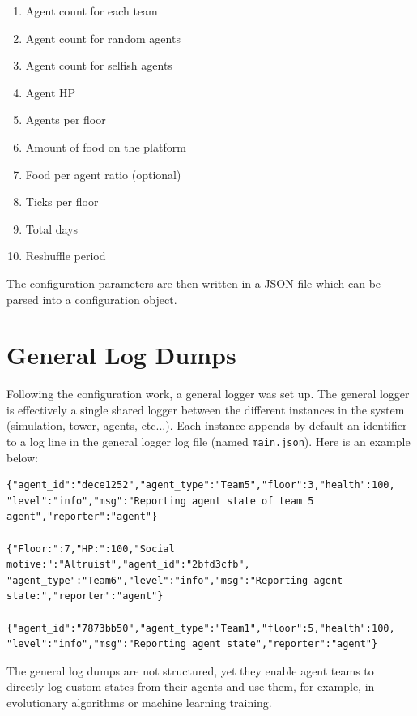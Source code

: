 \begin{multicols}{2}
    \begin{enumerate}
        \item Agent count for each team
        \item Agent count for random agents
        \item Agent count for selfish agents
        \item Agent HP
        \item Agents per floor
        \item Amount of food on the platform
        \item Food per agent ratio (optional)
        \item Ticks per floor
        \item Total days
        \item Reshuffle period
    \end{enumerate}

The configuration parameters are then written in a JSON file which can be parsed into a configuration object.

\section{General Log Dumps}

Following the configuration work, a general logger was set up. The general logger is effectively a single shared logger between the different instances in the system (simulation, tower, agents, etc...). Each instance appends by default an identifier to a log line in the general logger log file (named \texttt{main.json}). Here is an example below:

\begin{verbatim}
{"agent_id":"dece1252","agent_type":"Team5","floor":3,"health":100,
"level":"info","msg":"Reporting agent state of team 5 agent","reporter":"agent"}

{"Floor:":7,"HP:":100,"Social motive:":"Altruist","agent_id":"2bfd3cfb",
"agent_type":"Team6","level":"info","msg":"Reporting agent state:","reporter":"agent"}

{"agent_id":"7873bb50","agent_type":"Team1","floor":5,"health":100,
"level":"info","msg":"Reporting agent state","reporter":"agent"}
\end{verbatim}

The general log dumps are not structured, yet they enable agent teams to directly log custom states from their agents and use them, for example, in evolutionary algorithms or machine learning training.


\end{multicols}
